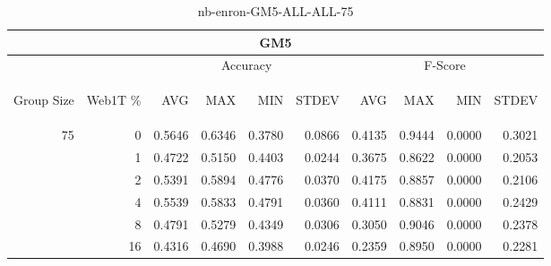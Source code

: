 \begin{center}
\begin{table}[htbp] 
 \begin{center}
\begin{tabular}{ | r | r | r | r | r | r | r | r | r | r |}
\hline
\multicolumn{10}{|c|}{GM5}\\
\hline
 & & \multicolumn{4}{|c|}{Accuracy} & \multicolumn{4}{|c|}{F-Score}\\ \cline{3-10}
\begin{sideways}Group Size\end{sideways} & \begin{sideways}Web1T \%\end{sideways} & \begin{sideways}AVG\end{sideways} & \begin{sideways}MAX\end{sideways} & \begin{sideways}MIN\end{sideways} & \begin{sideways}STDEV\end{sideways} & \begin{sideways}AVG\end{sideways} & \begin{sideways}MAX\end{sideways} & \begin{sideways}MIN\end{sideways} & \begin{sideways}STDEV\end{sideways}\\
\hline
\multirow{5}{*}{75}
 & 0 & 0.5646 & 0.6346 & 0.3780 & 0.0866 & 0.4135 & 0.9444 & 0.0000 & 0.3021\\ \cline{2-10}
 & 1 & 0.4722 & 0.5150 & 0.4403 & 0.0244 & 0.3675 & 0.8622 & 0.0000 & 0.2053\\ \cline{2-10}
 & 2 & 0.5391 & 0.5894 & 0.4776 & 0.0370 & 0.4175 & 0.8857 & 0.0000 & 0.2106\\ \cline{2-10}
 & 4 & 0.5539 & 0.5833 & 0.4791 & 0.0360 & 0.4111 & 0.8831 & 0.0000 & 0.2429\\ \cline{2-10}
 & 8 & 0.4791 & 0.5279 & 0.4349 & 0.0306 & 0.3050 & 0.9046 & 0.0000 & 0.2378\\ \cline{2-10}
 & 16 & 0.4316 & 0.4690 & 0.3988 & 0.0246 & 0.2359 & 0.8950 & 0.0000 & 0.2281\\ \cline{2-10}
\hline
\end{tabular}
\caption{nb-enron-GM5-ALL-ALL-75}
\label{table:nb-enron-GM5-ALL-ALL-75}
\end{center}
 \end{table}
\end{center}

